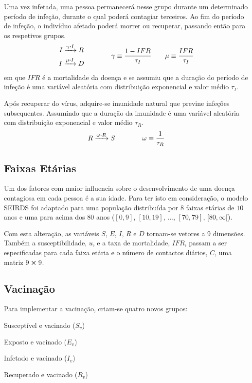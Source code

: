 Uma vez infetada, uma pessoa permanecerá nesse grupo durante um determinado período de infeção, durante o qual poderá contagiar terceiros.
Ao fim do período de infeção, o indivíduo afetado poderá morrer ou recuperar, passando então para os respetivos grupos.
\begin{equation*}
        \begin{gathered}
            I \xrightarrow{\gamma\vdot I} R \\
            I \xrightarrow{\mu\vdot I} D \\
        \end{gathered}
        \qquad\qquad
        \gamma \equiv \frac{1-IFR}{\tau_I}
        \qquad
        \mu \equiv \frac{IFR}{\tau_I}
\end{equation*}
em que $IFR$ é a mortalidade da doença e se assumiu que a duração do período de infeção é uma variável aleatória com distribuição exponencial e valor médio $\tau_I$.

Após recuperar do vírus, adquire-se imunidade natural que previne infeções subsequentes.
Assumindo que a duração da imunidade é uma variável aleatória com distribuição exponencial e valor médio $\tau_R$.
\begin{equation*}
        R \xrightarrow{\omega\vdot R} S
        \qquad\qquad
        \omega \equiv \frac{1}{\tau_R}
\end{equation*}

\subsection{Faixas Etárias}
Um dos fatores com maior influencia sobre o desenvolvimento de uma doença contagiosa em cada pessoa é a sua idade.
Para ter isto em consideração, o modelo SEIRDS foi adaptado para uma população distribuída por 8 faixas etárias de $10$ anos e uma para acima dos $80$ anos ($[0,9]$, $[10,19]$, ..., $[70,79]$, $[80,\infty[$).

Com esta alteração, as variáveis $S$, $E$, $I$, $R$ e $D$ tornam-se vetores a 9 dimensões.
Também a susceptibilidade, $u$, e a taxa de mortalidade, $IFR$, passam a ser especificadas para cada faixa etária e o número de contactos diários, $C$, uma matriz $9\cp9$.

\subsection{Vacinação}
Para implementar a vacinação, criam-se quatro novos grupos:
\begin{itemize}\begin{multicols}{2}
        \item Susceptível e vacinado ($S_v$)
        \item Exposto e vacinado ($E_v$)
        \item Infetado e vacinado ($I_v$)
        \item Recuperado e vacinado ($R_v$)
\end{multicols}\end{itemize}

